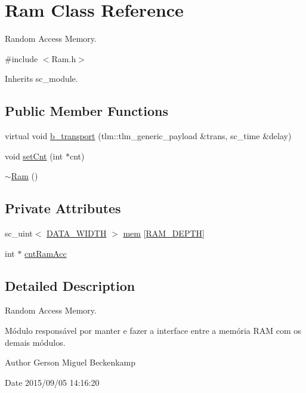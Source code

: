 \hypertarget{classRam}{\section{Ram Class Reference}
\label{classRam}
}


Random Access Memory.  




{\ttfamily \#include $<$Ram.\+h$>$}



Inherits sc\+\_\+module.

\subsection*{Public Member Functions}
\begin{DoxyCompactItemize}
\item 
virtual void \hyperlink{classRam_a93cee12a3589cd5b05e16a88ed0ed5f1}{b\+\_\+transport} (tlm\+::tlm\+\_\+generic\+\_\+payload \&trans, sc\+\_\+time \&delay)
\item 
void \hyperlink{classRam_a46c816589d792c2c92a822846aad4119}{set\+Cnt} (int $\ast$cnt)
\item 
\hyperlink{classRam_a88fb1e8b99dad1628805952c41a146e3}{$\sim$\+Ram} ()
\end{DoxyCompactItemize}
\subsection*{Private Attributes}
\begin{DoxyCompactItemize}
\item 
sc\+\_\+uint$<$ \hyperlink{Defines_8h_af087b76f9707be9d3b43ba0c782c31c3}{D\+A\+T\+A\+\_\+\+W\+I\+D\+T\+H} $>$ \hyperlink{classRam_ade86bafdb14f3ddb236bcf807abab45c}{mem} \mbox{[}\hyperlink{Defines_8h_ab683dabe89fc48ada1209e0e3733862a}{R\+A\+M\+\_\+\+D\+E\+P\+T\+H}\mbox{]}
\item 
int $\ast$ \hyperlink{classRam_a0ee6ab8e997240bb0d37947f67c0ab7a}{cnt\+Ram\+Acc}
\end{DoxyCompactItemize}


\subsection{Detailed Description}
Random Access Memory. 

Módulo responsável por manter e fazer a interface entre a memória R\+A\+M com os demais módulos.

\begin{DoxyAuthor}{Author}
Gerson Miguel Beckenkamp 
\end{DoxyAuthor}
\begin{DoxyDate}{Date}
2015/09/05 14\+:16\+:20 
\end{DoxyDate}



